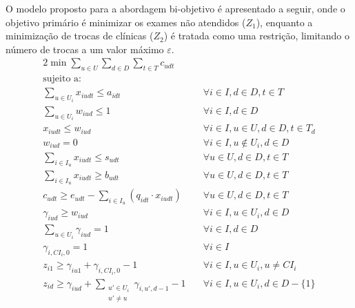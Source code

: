 O modelo proposto para a abordagem bi-objetivo é apresentado a seguir, onde o objetivo primário é minimizar os exames não atendidos ($Z_1$), enquanto a minimização de trocas de clínicas ($Z_2$) é tratada como uma restrição, limitando o número de trocas a um valor máximo $\varepsilon$.
\begin{alignat}{2}
    \min \sum_{u \in U}\sum_{d \in D}\sum_{t \in T} c_{udt} \quad         &                                              \\
    \text{sujeito a:} \quad                                               &                                              \\
    \sum_{u \in U_i} x_{iudt} \leq a_{idt}  \quad                         & \forall i \in I, d \in D, t \in T            \\
    \sum_{u \in U_i} w_{iud} \leq 1  \quad                                & \forall i \in I, d \in D                     \\
    x_{iudt} \leq w_{iud} \quad                                           & \forall i \in I, u \in U, d \in D, t \in T_d \\
    w_{iud} = 0 \quad                                                     & \forall i \in I, u \notin U_i, d \in D       \\
    \sum_{i \in I_u} x_{iudt} \leq s_{udt} \quad                          & \forall u \in U, d \in D, t \in T            \\
    \sum_{i \in I_u}x_{iudt} \geq b_{udt} \quad                           & \forall u \in U, d \in D, t \in T            \\
    c_{udt} \geq e_{udt} - \sum_{i \in I_u}(q_{idt} \cdot x_{iudt}) \quad & \forall u \in U, d \in D, t \in T            \\
    \gamma_{iud} \geq w_{iud} \quad                                       & \forall i \in I, u \in U_i, d \in D          \\
    \sum_{u \in U_i} \gamma_{iud} = 1 \quad                               & \forall i \in I, d \in D                     \\
    \gamma_{i,CI_i,0} = 1 \quad                                           & \forall i \in I                              \\
    z_{i1} \geq \gamma_{iu1} + \gamma_{i,CI_i,0} - 1 \quad                & \forall i \in I, u \in U_i, u \neq CI_i      \\
    z_{id} \geq \gamma_{iud} + \sum_{\substack{u' \in U_i                                                                \\ u' \neq u}} \gamma_{i,u',d-1} - 1 \quad & \forall i \in I, u \in U_i, d \in D - \{1\} \\

\end{alignat}
